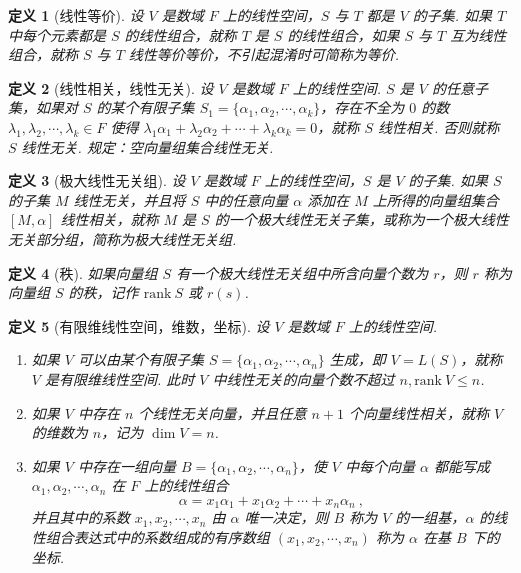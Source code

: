 \documentclass[zihao=-4,UTF8,linespread=1.8,nothm]{aytony_base}
\newtheorem{definition}{\indent 定义}[subsection]
\begin{document}
\begin{definition}[线性等价]
    设 $V$ 是数域 $F$ 上的线性空间，$S$ 与 $T$ 都是 $V$ 的子集. 如果 $T$ 中每个元素都是 $S$ 的线性组合，就称 $T$ 是 $S$ 的线性组合，如果 $S$ 与 $T$ 互为线性组合，就称 $S$ 与 $T$ 线性等价等价，不引起混淆时可简称为等价.
\end{definition}

\begin{definition}[线性相关，线性无关]
    设 $V$ 是数域 $F$ 上的线性空间. $S$ 是 $V$ 的任意子集，如果对 $S$ 的某个有限子集 $S_1 = \{\alpha_1, \alpha_2, \cdots, \alpha_k\}$，存在不全为 $0$ 的数 $\lambda_1, \lambda_2, \cdots, \lambda_k \in F$ 使得 $\lambda_1 \alpha_1 + \lambda_2 \alpha_2 + \cdots + \lambda_k \alpha_k = 0$，就称 $S$ 线性相关. 否则就称 $S$ 线性无关. 规定：空向量组集合线性无关.
\end{definition}

\begin{definition}[极大线性无关组]
    设 $V$ 是数域 $F$ 上的线性空间，$S$ 是 $V$ 的子集. 如果 $S$ 的子集 $M$ 线性无关，并且将 $S$ 中的任意向量 $\alpha$ 添加在 $M$ 上所得的向量组集合 $[M, \alpha]$ 线性相关，就称 $M$ 是 $S$ 的一个极大线性无关子集，或称为一个极大线性无关部分组，简称为极大线性无关组.
\end{definition}

\begin{definition}[秩]
    如果向量组 $S$ 有一个极大线性无关组中所含向量个数为 $r$，则 $r$ 称为向量组 $S$ 的秩，记作 $\mathrm{rank}\ S$ 或 $r(s)$.
\end{definition}

\begin{definition}[有限维线性空间，维数，坐标]
    设 $V$ 是数域 $F$ 上的线性空间.
    \begin{enumerate}[nosep]
        \item 如果 $V$ 可以由某个有限子集 $S = \{\alpha_1, \alpha_2, \cdots, \alpha_n\}$ 生成，即 $V = L(S)$，就称 $V$ 是有限维线性空间. 此时 $V$ 中线性无关的向量个数不超过 $n,\mathrm{rank}\ V \leqslant n$.
        \item 如果 $V$ 中存在 $n$ 个线性无关向量，并且任意 $n+1$ 个向量线性相关，就称 $V$ 的维数为 $n$，记为 $\dim V = n$.
        \item 如果 $V$ 中存在一组向量 $B = \{\alpha_1, \alpha_2, \cdots, \alpha_n\}$，使 $V$ 中每个向量 $\alpha$ 都能写成 $\alpha_1, \alpha_2, \cdots, \alpha_n$ 在 $F$ 上的线性组合 $$
                  \alpha = x_1 \alpha_1 + x_1 \alpha_2 + \cdots + x_n \alpha_n\ ,
              $$ 并且其中的系数 $x_1, x_2, \cdots, x_n$ 由 $\alpha$ 唯一决定，则 $B$ 称为 $V$ 的一组基，$\alpha$ 的线性组合表达式中的系数组成的有序数组 $(x_1, x_2, \cdots, x_n)$ 称为 $\alpha$ 在基 $B$ 下的坐标.
    \end{enumerate}
\end{definition}
\end{document}
